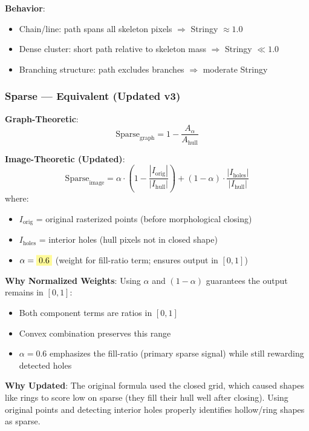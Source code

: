 \documentclass[11pt]{article}
\newcommand{\param}[1]{\colorbox{yellow!40}{$#1$}}
\begin{document}
\textbf{Behavior}:
\begin{itemize}
    \item Chain/line: path spans all skeleton pixels $\Rightarrow$ Stringy $\approx 1.0$
    \item Dense cluster: short path relative to skeleton mass $\Rightarrow$ Stringy $\ll 1.0$
    \item Branching structure: path excludes branches $\Rightarrow$ moderate Stringy
\end{itemize}

\subsubsection{Sparse — \textcolor{equivalent}{Equivalent} (Updated v3)}

\textbf{Graph-Theoretic}:
\begin{equation}
    \text{Sparse}_{\text{graph}} = 1 - \frac{A_{\alpha}}{A_{\text{hull}}}
\end{equation}

\textbf{Image-Theoretic (Updated)}:
\begin{equation}
    \text{Sparse}_{\text{image}} = \alpha \cdot \left(1 - \frac{|I_{\text{orig}}|}{|I_{\text{hull}}|}\right) + (1 - \alpha) \cdot \frac{|I_{\text{holes}}|}{|I_{\text{hull}}|}
\end{equation}
where:
\begin{itemize}
    \item $I_{\text{orig}}$ = original rasterized points (before morphological closing)
    \item $I_{\text{holes}}$ = interior holes (hull pixels not in closed shape)
    \item $\alpha = \param{0.6}$ (weight for fill-ratio term; ensures output in $[0,1]$)
\end{itemize}

\textbf{Why Normalized Weights}: Using $\alpha$ and $(1-\alpha)$ guarantees the output remains in $[0,1]$:
\begin{itemize}
    \item Both component terms are ratios in $[0,1]$
    \item Convex combination preserves this range
    \item $\alpha = 0.6$ emphasizes the fill-ratio (primary sparse signal) while still rewarding detected holes
\end{itemize}

\textbf{Why Updated}: The original formula used the closed grid, which caused shapes like rings to score low on sparse (they fill their hull well after closing). Using original points and detecting interior holes properly identifies hollow/ring shapes as sparse.
\end{document}
